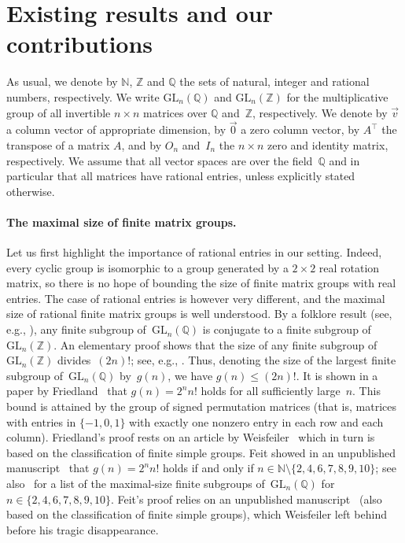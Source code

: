 \documentclass{lmcs}
\theoremstyle{definition}
\newcommand{\GL}{\mathrm{GL}}
\newcommand{\N}{\mathbb{N}}
\newcommand{\Q}{\mathbb{Q}}
\newcommand{\Z}{\mathbb{Z}}
\begin{document}
\section{Existing results and our contributions}\label{sec:existing}


As usual, we denote by $\N$, $\Z$ and $\Q$ the sets of natural, integer and rational numbers, respectively.
We write $\GL_n(\Q)$ and $\GL_n(\Z)$ for the multiplicative group of all invertible $n \times n$ matrices over $\Q$ and~$\Z$, respectively. We denote by $\vec{v}$ a column vector of appropriate dimension, by $\vec{0}$ a zero column vector, by $A^\top$ the transpose of a matrix $A$, and by $O_n$ and~$I_n$ the $n\times n$ zero and identity  matrix, respectively. We assume that all vector spaces are over the field~$\Q$ and in particular that all matrices have rational entries, unless explicitly stated otherwise. 


\paragraph*{The maximal size of finite matrix groups.}

Let us first highlight the importance of rational entries in our setting. Indeed, every cyclic group is isomorphic to a group generated by a $2 \times 2$ real rotation matrix, so there is no hope of bounding the size of finite matrix groups with real entries. The case of rational entries is however very different, and the maximal size of rational finite matrix groups is well understood.
By a folklore result (see, e.g., \cite[Theorem~1.6]{KuzmanovichPavlichenkov02}), any finite subgroup of~$\GL_n(\Q)$ is conjugate to a finite subgroup of~$\GL_n(\Z)$.
An elementary proof shows that the size of any finite subgroup of~$\GL_n(\Z)$ divides~$(2 n)!$; see, e.g., \cite[Chapter~IX]{Newman1972}.
Thus, denoting the size of the largest finite subgroup of~$\GL_n(\Q)$ by~$g(n)$, we have $g(n) \le (2 n)!$.
It is shown in a paper by Friedland~\cite{Friedland97} that $g(n) = 2^n n!$ holds for all sufficiently large~$n$.
This bound is attained by the group of signed permutation matrices (that is, matrices with entries in $\{-1, 0, 1\}$ with exactly one nonzero entry in each row and each column).
Friedland's proof rests on an article by Weisfeiler~\cite{Weisfeiler84} which in turn is based on the classification of finite simple groups.
Feit showed in an unpublished manuscript~\cite{FeitUnp} that $g(n) = 2^n n!$ holds if and only if $n \in \N \setminus \{2,4,6,7,8,9,10\}$; see also~\cite[Table~1]{Berry04} for a list of the maximal-size finite subgroups of~$\GL_n(\Q)$ for $n \in \{2,4,6,7,8,9,10\}$.
Feit's proof relies on an unpublished manuscript~\cite{WeisfeilerUnp} (also based on the classification of finite simple groups), which Weisfeiler left behind before his tragic disappearance.
\end{document}
